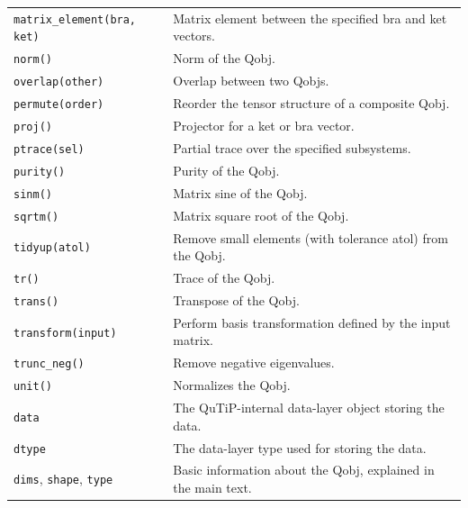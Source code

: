 \documentclass[preprint,3p,sort&compress]{elsarticle}
\def\code#1{\texttt{#1}}
\begin{document}
\begin{table}[!hp]
\begin{tabular}{@{}lp{10cm}@{}}
        \code{matrix\_element(bra, ket)} & Matrix element between the specified bra and ket vectors. \\

        \code{norm()} & Norm of the Qobj. \\
     
        \code{overlap(other)} & Overlap between two Qobjs. \\

        \code{permute(order)} & Reorder the tensor structure of a composite Qobj. \\

        \code{proj()} & Projector for a ket or bra vector. \\
  
        \code{ptrace(sel)} & Partial trace over the specified subsystems. \\
 
        \code{purity()} & Purity of the Qobj. \\

        \code{sinm()} & Matrix sine of the Qobj. \\
   
        \code{sqrtm()} & Matrix square root of the Qobj. \\

        \code{tidyup(atol)} & Remove small elements (with tolerance atol) from the Qobj. \\

        \code{tr()} & Trace of the Qobj. \\
 
        \code{trans()} & Transpose of the Qobj. \\
   
        \code{transform(input)} & Perform basis transformation defined by the input matrix. \\

        \code{trunc\_neg()} & Remove negative eigenvalues. \\

        \code{unit()} & Normalizes the Qobj. \\

        \code{data} & The QuTiP-internal data-layer object storing the data. \\

        \code{dtype} & The data-layer type used for storing the data. \\

        \code{dims}, \code{shape}, \code{type} & Basic information about the Qobj, explained in the main text. \\


\end{tabular}
\end{table}
\end{document}
